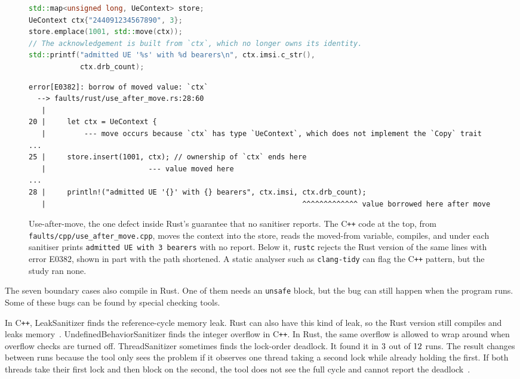 \documentclass[english,oneside,a4paper,censored,csm,software-track-2020]{HYthesisML}
\begin{document}
\begin{figure}[!ht]
\centering
\begin{minipage}{\linewidth}
\begin{lstlisting}[language=C++]
std::map<unsigned long, UeContext> store;
UeContext ctx{"244091234567890", 3};
store.emplace(1001, std::move(ctx));
// The acknowledgement is built from `ctx`, which no longer owns its identity.
std::printf("admitted UE '%s' with %d bearers\n", ctx.imsi.c_str(),
            ctx.drb_count);
\end{lstlisting}
\medskip
\begin{lstlisting}[basicstyle=\ttfamily\fontsize{7.4}{8.8}\selectfont]
error[E0382]: borrow of moved value: `ctx`
  --> faults/rust/use_after_move.rs:28:60
   |
20 |     let ctx = UeContext {
   |         --- move occurs because `ctx` has type `UeContext`, which does not implement the `Copy` trait
...
25 |     store.insert(1001, ctx); // ownership of `ctx` ends here
   |                        --- value moved here
...
28 |     println!("admitted UE '{}' with {} bearers", ctx.imsi, ctx.drb_count);
   |                                                            ^^^^^^^^^^^^^ value borrowed here after move
\end{lstlisting}
\end{minipage}
\caption[Use-after-move in both languages]{Use-after-move, the one defect
inside Rust's guarantee that no sanitiser reports. The
C\texttt{++} code at the top, from \texttt{faults/cpp/use\_after\_move.cpp},
moves the context into the store, reads the moved-from variable, compiles, and
under each sanitiser prints \texttt{admitted UE \textquotesingle\textquotesingle{} with 3 bearers} with no
report. Below it, \texttt{rustc} rejects the Rust version of the same lines
with error E0382, shown in part with the path shortened. A static analyser such as
\texttt{clang-tidy} can flag the C\texttt{++} pattern, but the study ran
none.\label{fig:uam}}
\end{figure}

The seven boundary cases also compile in Rust. One of them needs an \texttt{unsafe} block, 
but the bug can still happen when the program runs. Some of these bugs can be found by special checking tools.

In C\texttt{++}, LeakSanitizer finds the reference-cycle memory leak. 
Rust can also have this kind of leak, so the Rust version still compiles 
and leaks memory~\cite{hughes2025gcrust,cui2024rcanary}. 
UndefinedBehaviorSanitizer finds the integer overflow in C\texttt{++}. 
In Rust, the same overflow is allowed to wrap around when overflow checks are turned off. 
ThreadSanitizer sometimes finds the lock-order deadlock. 
It found it in $3$ out of $12$ runs. 
The result changes between runs because the tool only sees the problem if it observes one thread 
taking a second lock while already holding the first. If both threads take their first lock and 
then block on the second, the tool does not see the full cycle and cannot report the deadlock~\cite{tsandeadlock}.
\end{document}
